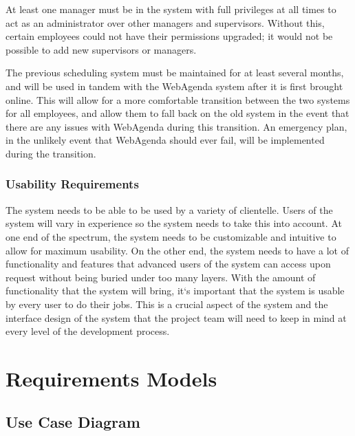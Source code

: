 \documentclass[letterpaper,12pt]{report}
\begin{document}
	At least one manager must be in the system with full privileges at all times to act as an administrator over other managers and supervisors.  Without this, certain employees could not have their permissions upgraded; it would not be possible to add new supervisors or managers.

	The previous scheduling system must be maintained for at least several months, and will be used in tandem with the WebAgenda system after it is first brought online.  This will allow for a more comfortable transition between the two systems for all employees, and allow them to fall back on the old system in the event that there are any issues with WebAgenda during this transition. An emergency plan, in the unlikely event that WebAgenda should ever fail, will be implemented during the transition.

\pagebreak
\section{Usability Requirements}
\hspace{1cm}The system needs to be able to be used by a variety of clientelle. Users of the system will vary in experience so the system needs to take this into account. At one end of the spectrum, the system needs to be customizable and intuitive to allow for maximum usability.  On the other end, the system needs to have a lot of functionality and features that advanced users of the system can access upon request without being buried under too many layers.
	With the amount of functionality that the system will bring, it`s important that the system is usable by every user to do their jobs. This is a crucial aspect of the system and the interface design of the system that the project team will need to keep in mind at every level of the development process.

\part{Requirements Models} 
\chapter{Use Case Diagram}
\newpage
\end{document}

